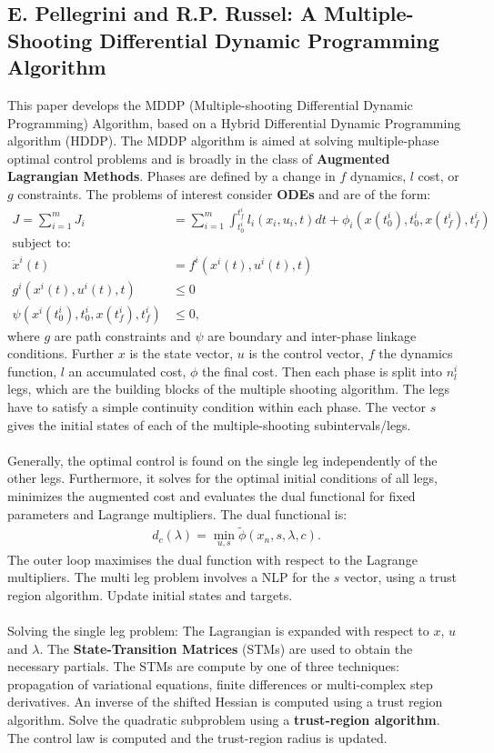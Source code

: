 \documentclass[11pt, a4paper]{article}
\theoremstyle{definition}
\begin{document}
\subsection{E. Pellegrini and R.P. Russel: A Multiple-Shooting Differential Dynamic Programming Algorithm}
This paper develops the MDDP (Multiple-shooting Differential Dynamic Programming) Algorithm, based on a Hybrid Differential Dynamic Programming algorithm (HDDP). The MDDP algorithm is aimed at solving multiple-phase optimal control problems and is broadly in the class of \textbf{Augmented Lagrangian Methods}. Phases are defined by a change in $f$ dynamics, $l$ cost, or $g$ constraints.
The problems of interest consider \textbf{ODEs} and are of the form:
\begin{align*}
J= \sum_{i=1}^m J_i &= \sum_{i=1}^m \int_{t^i_0}^{t_f^i} l_i(x_i,u_i,t) dt + \phi_i(x(t_0^i),t_0^i, x(t_f^i),t_f^i)\\
\text{subject to:}&\\
\dot{x}^i(t) &= f^i(x^i(t),u^i(t),t)\\
g^i(x^i(t),u^i(t),t) &\leq 0\\
\psi(x^i(t^i_0),t_0^i, x(t_f^i),t_f^i) &\leq 0,
\end{align*}
where $g$ are path constraints and $\psi$ are boundary and inter-phase linkage conditions.
Further $x$ is the state vector, $u$ is the control vector, $f$ the dynamics function, $l$ an accumulated cost, $\phi$ the final cost. 
Then each phase is split into $n_l^i$ legs, which are the building blocks of the multiple shooting algorithm. The legs have to satisfy a simple continuity condition within each phase. The vector $s$ gives the initial states of each of the multiple-shooting subintervals/legs.
\\
\\
Generally, the optimal control is found on the single leg independently of the other legs. Furthermore, it solves for the optimal initial conditions of all legs, minimizes the augmented cost and evaluates the dual functional for fixed parameters and Lagrange multipliers.
The dual functional is:
\begin{align*}
d_c(\lambda)=\min_{u,s}\tilde \phi (x_n,s, \lambda,c).
\end{align*}
The outer loop maximises the dual function with respect to the Lagrange multipliers.
The multi leg problem involves a NLP for the $s$ vector, using a trust region algorithm. Update initial states and targets.
\\
\\
Solving the single leg problem:
The Lagrangian is expanded with respect to $x$, $u$ and $\lambda$. The \textbf{State-Transition Matrices} (STMs) are used to obtain the necessary partials. The STMs are compute by one of three techniques: propagation of variational equations, finite differences or multi-complex step derivatives.
An inverse of the shifted Hessian is computed using a trust region algorithm.
Solve the quadratic subproblem using a \textbf{trust-region algorithm}. The control law is computed and the trust-region radius is updated.
\end{document}
